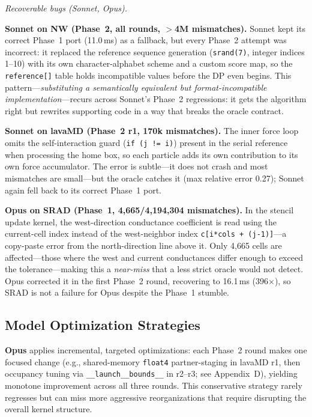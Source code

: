 \documentclass[conference]{IEEEtran}
\begin{document}
\medskip\noindent\textit{Recoverable bugs (Sonnet, Opus).}

\textbf{Sonnet on NW (Phase~2, all rounds, $>$4M mismatches).}
Sonnet kept its correct Phase~1 port (11.0\,ms) as a fallback, but every Phase~2
attempt was incorrect: it replaced the reference sequence generation
(\texttt{srand(7)}, integer indices 1--10) with its own character-alphabet
scheme and a custom score map, so the \texttt{reference[]} table holds
incompatible values before the DP even begins. This pattern---\emph{substituting
a semantically equivalent but format-incompatible implementation}---recurs across
Sonnet's Phase~2 regressions: it gets the algorithm right but rewrites supporting
code in a way that breaks the oracle contract.

\textbf{Sonnet on lavaMD (Phase~2 r1, 170k mismatches).}
The inner force loop omits the self-interaction guard (\texttt{if (j != i)})
present in the serial reference when processing the home box, so each particle
adds its own contribution to its own force accumulator. The error is subtle---it
does not crash and most mismatches are small---but the oracle catches it
(max relative error 0.27); Sonnet again fell back to its correct Phase~1 port.

\textbf{Opus on SRAD (Phase~1, 4,665/4,194,304 mismatches).}
In the stencil update kernel, the west-direction conductance coefficient is
read using the current-cell index instead of the west-neighbor index
\texttt{c[i*cols + (j-1)]}---a copy-paste error from the north-direction line
above it. Only 4,665 cells are affected---those where the west and current
conductances differ enough to exceed the tolerance---making this a
\emph{near-miss} that a less strict oracle would not detect. Opus corrected it
in the first Phase~2 round, recovering to 16.1\,ms (396$\times$), so SRAD is not
a failure for Opus despite the Phase~1 stumble.

\subsection{Model Optimization Strategies}

\textbf{Opus} applies incremental, targeted optimizations: each Phase~2 round
makes one focused change (e.g., shared-memory \texttt{float4} partner-staging in
lavaMD r1, then occupancy tuning via \texttt{\_\_launch\_\_bounds\_\_} in
r2--r3; see Appendix~D), yielding monotone improvement across all three rounds.
This conservative strategy rarely regresses but can miss more aggressive
reorganizations that require disrupting the overall kernel structure.
\end{document}
